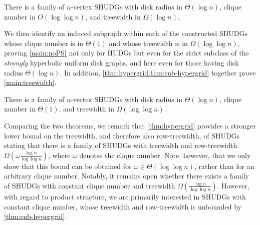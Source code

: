 \documentclass[a4paper,english,cleveref,thm-restate]{lipics-v2021}
\newcommand{\Thomas}[1]{\todo[inline,caption=,backgroundcolor=blue!25]{#1}}
\begin{document}

\begin{theorem}\label{thm:hypergrid}
    There is a family of $ n $-vertex SHUDGs with disk radius in $\Theta(\log n)$, clique number
    in $O(\log \log n)$, and treewidth in $\Omega(\log n)$.
\end{theorem}

We then identify an induced subgraph within each of the constructed SHUDGs whose clique number is in $\Theta(1)$ and whose
treewidth is in $\Omega(\log \log n)$, proving \cref{main:noPS} not only for HUDGs but even for the strict subclass of the \emph{strongly} hyperbolic uniform disk graphs, and here even for those having disk radius $ \Theta(\log n)$.
In addition, \cref{thm:hypergrid,thm:sub-hypergrid} together prove \cref{main:treewidth}.

\begin{theorem}\label{thm:sub-hypergrid}
    There is a family of $ n $-vertex SHUDGs with disk radius in $\Theta(\log n)$, clique number in $\Theta(1)$,
    and treewidth in $\Omega(\log \log n)$.
\end{theorem}
%
Comparing the two theorems, we remark that \cref{thm:hypergrid} provides a stronger lower bound on the treewidth, and therefore also row-treewidth, of SHUDGs stating that there is a family of SHUDGs
with treewidth and row-treewidth $\Omega (\omega \frac{\log n}{\log \log n} )$, where $\omega$ denotes the clique number.
Note, however, that we only show that this bound can be obtained for $\omega \in \Theta(\log \log n)$, rather than for an
arbitrary clique number.
Notably, it remains open whether there exists a family of SHUDGs with constant clique number and treewidth $\Omega ( \frac{\log n}{\log \log n} )$.
However, with regard to product structure, we are primarily interested in SHUDGs with constant clique number, whose treewidth and row-treewidth is unbounded by \cref{thm:sub-hypergrid}.
\end{document}

